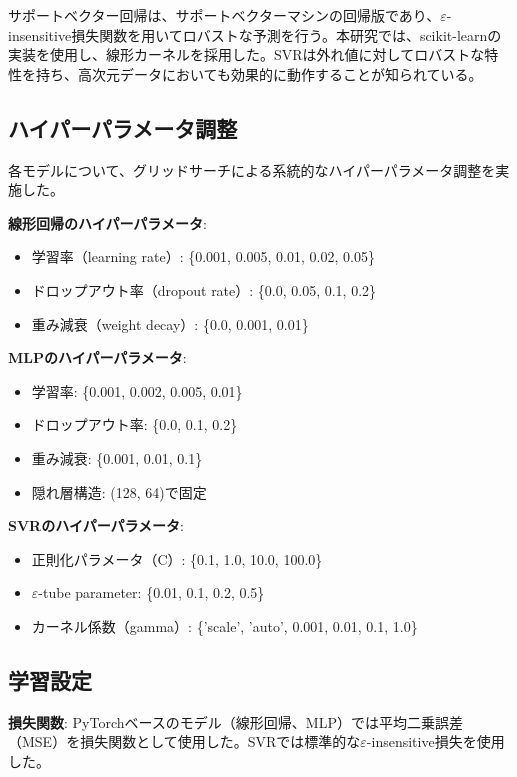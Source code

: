 \documentclass[12pt,a4paper,dvipdfmx]{jsarticle}
\begin{document}
サポートベクター回帰は、サポートベクターマシンの回帰版であり、$\varepsilon$-insensitive損失関数を用いてロバストな予測を行う。本研究では、scikit-learnの実装を使用し、線形カーネルを採用した。SVRは外れ値に対してロバストな特性を持ち、高次元データにおいても効果的に動作することが知られている。

\subsection{ハイパーパラメータ調整}

各モデルについて、グリッドサーチによる系統的なハイパーパラメータ調整を実施した。

\textbf{線形回帰のハイパーパラメータ}:
\begin{itemize}
    \item 学習率（learning rate）: \{0.001, 0.005, 0.01, 0.02, 0.05\}
    \item ドロップアウト率（dropout rate）: \{0.0, 0.05, 0.1, 0.2\}
    \item 重み減衰（weight decay）: \{0.0, 0.001, 0.01\}
\end{itemize}

\textbf{MLPのハイパーパラメータ}:
\begin{itemize}
    \item 学習率: \{0.001, 0.002, 0.005, 0.01\}
    \item ドロップアウト率: \{0.0, 0.1, 0.2\}
    \item 重み減衰: \{0.001, 0.01, 0.1\}
    \item 隠れ層構造: (128, 64)で固定
\end{itemize}

\textbf{SVRのハイパーパラメータ}:
\begin{itemize}
    \item 正則化パラメータ（C）: \{0.1, 1.0, 10.0, 100.0\}
    \item $\varepsilon$-tube parameter: \{0.01, 0.1, 0.2, 0.5\}
    \item カーネル係数（gamma）: \{'scale', 'auto', 0.001, 0.01, 0.1, 1.0\}
\end{itemize}

\subsection{学習設定}

\textbf{損失関数}: PyTorchベースのモデル（線形回帰、MLP）では平均二乗誤差（MSE）を損失関数として使用した。SVRでは標準的な$\varepsilon$-insensitive損失を使用した。
\end{document}
